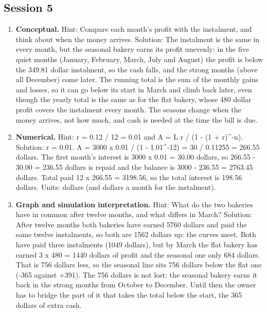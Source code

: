 \documentclass[11pt,a4paper]{article}
\begin{document}
\subsection*{Session 5}
\begin{enumerate}[nosep]
\item \textbf{Conceptual.} Hint: Compare each month's profit with the instalment, and think about when the money arrives. Solution: The instalment is the same in every month, but the seasonal bakery earns its profit unevenly: in the five quiet months (January, February, March, July and August) the profit is below the 349.81 dollar instalment, so the cash falls, and the strong months (above all December) come later. The running total is the sum of the monthly gains and losses, so it can go below its start in March and climb back later, even though the yearly total is the same as for the flat bakery, whose 480 dollar profit covers the instalment every month. The seasons change when the money arrives, not how much, and cash is needed at the time the bill is due.
\item \textbf{Numerical.} Hint: r = 0.12 / 12 = 0.01 and A = L r / (1 - (1 + r)\textasciicircum{}-n). Solution: r = 0.01. A = 3000 x 0.01 / (1 - 1.01\textasciicircum{}-12) = 30 / 0.11255 = 266.55 dollars. The first month's interest is 3000 x 0.01 = 30.00 dollars, so 266.55 - 30.00 = 236.55 dollars is repaid and the balance is 3000 - 236.55 = 2763.45 dollars. Total paid 12 x 266.55 = 3198.56, so the total interest is 198.56 dollars. Units: dollars (and dollars a month for the instalment).
\item \textbf{Graph and simulation interpretation.} Hint: What do the two bakeries have in common after twelve months, and what differs in March? Solution: After twelve months both bakeries have earned 5760 dollars and paid the same twelve instalments, so both are 1562 dollars up: the curves meet. Both have paid three instalments (1049 dollars), but by March the flat bakery has earned 3 x 480 = 1440 dollars of profit and the seasonal one only 684 dollars. That is 756 dollars less, so the seasonal line sits 756 dollars below the flat one (-365 against +391). The 756 dollars is not lost: the seasonal bakery earns it back in the strong months from October to December. Until then the owner has to bridge the part of it that takes the total below the start, the 365 dollars of extra cash.

\end{enumerate}
\end{document}
